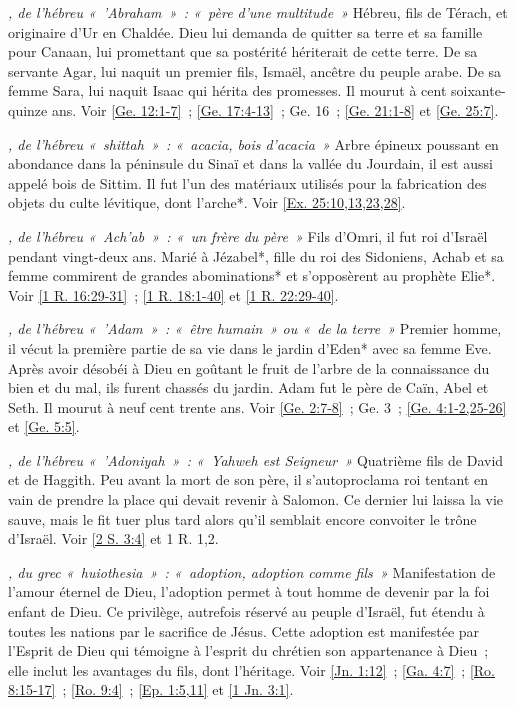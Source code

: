 \begin{multicols}{2}
\textit{, de l'hébreu «~'Abraham~»~: «~père d'une multitude~»}\newline
Hébreu, fils de Térach, et originaire d'Ur en Chaldée. Dieu lui demanda de quitter sa terre et sa famille pour Canaan, lui promettant que sa postérité hériterait de cette terre. De sa servante Agar, lui naquit un premier fils, Ismaël, ancêtre du peuple arabe. De sa femme Sara, lui naquit Isaac qui hérita des promesses. Il mourut à cent soixante-quinze ans. Voir \vref{Ge. 12:1-7}~; \vref{Ge. 17:4-13}~; Ge. 16~; \vref{Ge. 21:1-8} et \vref{Ge. 25:7}.

\textit{, de l'hébreu «~shittah~»~: «~acacia, bois d'acacia~»}\newline
Arbre épineux poussant en abondance dans la péninsule du Sinaï et dans la vallée du Jourdain, il est aussi appelé bois de Sittim. Il fut l'un des matériaux utilisés pour la fabrication des objets du culte lévitique, dont l'arche*. Voir \vref{Ex. 25:10,13,23,28}.

\textit{, de l'hébreu «~Ach'ab~»~: «~un frère du père~»}\newline
Fils d'Omri, il fut roi d'Israël pendant vingt-deux ans. Marié à Jézabel*, fille du roi des Sidoniens, Achab et sa femme commirent de grandes abominations* et s'opposèrent au prophète Elie*. Voir \vref{1 R. 16:29-31}~; \vref{1 R. 18:1-40} et \vref{1 R. 22:29-40}.

\textit{, de l'hébreu «~'Adam~»~: «~être humain~» ou «~de la terre~»}\newline
Premier homme, il vécut la première partie de sa vie dans le jardin d'Eden* avec sa femme Eve. Après avoir désobéi à Dieu en goûtant le fruit de l'arbre de la connaissance du bien et du mal, ils furent chassés du jardin. Adam fut le père de Caïn, Abel et Seth. Il mourut à neuf cent trente ans. Voir \vref{Ge. 2:7-8}~; Ge. 3~; \vref{Ge. 4:1-2,25-26} et \vref{Ge. 5:5}.

\textit{, de l'hébreu «~'Adoniyah~»~: «~Yahweh est Seigneur~»}\newline
Quatrième fils de David et de Haggith. Peu avant la mort de son père, il s'autoproclama roi tentant en vain de prendre la place qui devait revenir à Salomon. Ce dernier lui laissa la vie sauve, mais le fit tuer plus tard alors qu'il semblait encore convoiter le trône d'Israël. Voir \vref{2 S. 3:4} et 1 R. 1,2.

\textit{, du grec «~huiothesia~»~: «~adoption, adoption comme fils~»}\newline
Manifestation de l'amour éternel de Dieu, l'adoption permet à tout homme de devenir par la foi enfant de Dieu. Ce privilège, autrefois réservé au peuple d'Israël, fut étendu à toutes les nations par le sacrifice de Jésus. Cette adoption est manifestée par l'Esprit de Dieu qui témoigne à l'esprit du chrétien son appartenance à Dieu~; elle inclut les avantages du fils, dont l'héritage. Voir \vref{Jn. 1:12}~; \vref{Ga. 4:7}~; \vref{Ro. 8:15-17}~; \vref{Ro. 9:4}~; \vref{Ep. 1:5,11} et \vref{1 Jn. 3:1}.


\end{multicols}
